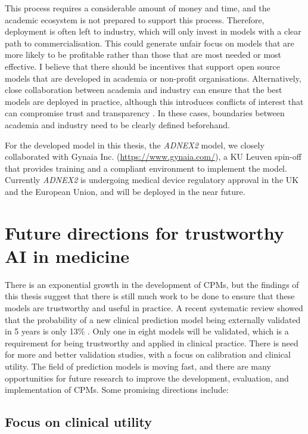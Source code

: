 This process requires a considerable amount of money and time, and the academic ecosystem is not prepared to support this process. Therefore, deployment is often left to industry, which will only invest in models with a clear path to commercialisation. This could generate unfair focus on models that are more likely to be profitable rather than those that are most needed or most effective. I believe that there should be incentives that support open source models that are developed in academia or non-profit organisations. Alternatively, close collaboration between academia and industry can ensure that the best models are deployed in practice, although this introduces conflicts of interest that can compromise trust and transparency \cite{pantanowitzRulesEngagementPromoting2022}. In these cases, boundaries between academia and industry need to be clearly defined beforehand.


For the developed model in this thesis, the \emph{ADNEX2} model, we closely collaborated with Gynaia Inc. (\url{https://www.gynaia.com/}), a KU Leuven spin-off that provides training and a compliant environment to implement the model. Currently \emph{ADNEX2} is undergoing medical device regulatory approval in the UK and the European Union, and will be deployed in the near future. 


\section{Future directions for trustworthy AI in medicine}

There is an exponential growth in the development of \glspl{CPM}, but the findings of this thesis suggest that there is still much work to be done to ensure that these models are trustworthy and useful in practice. A recent systematic review showed that the probability of a new clinical prediction model being externally validated in 5 years is only 13\% \cite{arshiNumberPublicationsNew2025}. Only one in eight models will be validated, which is a requirement for being trustworthy and applied in clinical practice. There is need for more and better validation studies, with a focus on calibration and clinical utility. The field of prediction models is moving fast, and there are many opportunities for future research to improve the development, evaluation, and implementation of \glspl{CPM}. Some promising directions include:

\subsection{Focus on clinical utility}


